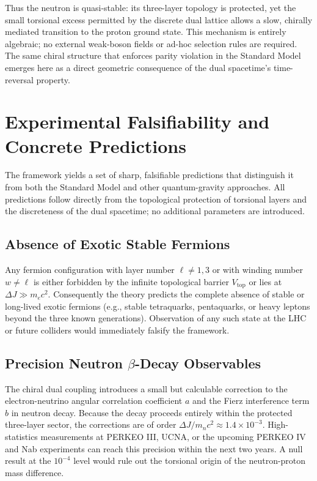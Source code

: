\documentclass[a4paper]{article}
\begin{document}
Thus the neutron is quasi-stable: its three-layer topology is protected, yet the small torsional excess permitted by the discrete dual lattice allows a slow, chirally mediated transition to the proton ground state. This mechanism is entirely algebraic; no external weak-boson fields or ad-hoc selection rules are required. The same chiral structure that enforces parity violation in the Standard Model emerges here as a direct geometric consequence of the dual spacetime's time-reversal property.

\section{Experimental Falsifiability and Concrete Predictions}

The framework yields a set of sharp, falsifiable predictions that distinguish it from both the Standard Model and other quantum-gravity approaches. All predictions follow directly from the topological protection of torsional layers and the discreteness of the dual spacetime; no additional parameters are introduced.

\subsection{Absence of Exotic Stable Fermions}

Any fermion configuration with layer number \(\ell \neq 1,3\) or with winding number \(w \neq \ell\) is either forbidden by the infinite topological barrier \(V_\text{top}\) or lies at \(\Delta J \gg m_e c^2\). Consequently the theory predicts the complete absence of stable or long-lived exotic fermions (e.g., stable tetraquarks, pentaquarks, or heavy leptons beyond the three known generations). Observation of any such state at the LHC or future colliders would immediately falsify the framework.

\subsection{Precision Neutron \texorpdfstring{$\beta$}{beta}-Decay Observables}

The chiral dual coupling introduces a small but calculable correction to the electron-neutrino angular correlation coefficient \(a\) and the Fierz interference term \(b\) in neutron decay. Because the decay proceeds entirely within the protected three-layer sector, the corrections are of order \(\Delta J / m_n c^2 \approx 1.4 \times 10^{-3}\). High-statistics measurements at PERKEO III, UCNA, or the upcoming PERKEO IV and Nab experiments can reach this precision within the next two years. A null result at the \(10^{-4}\) level would rule out the torsional origin of the neutron-proton mass difference.
\end{document}
